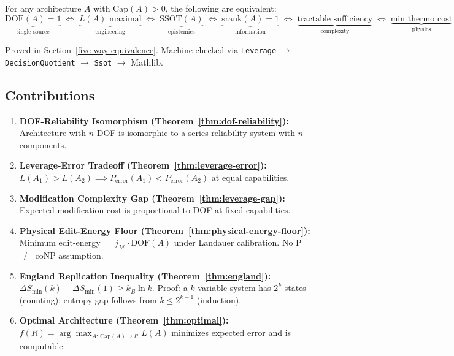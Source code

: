 \begin{theorem}\label{thm:five-way}
For any architecture $A$ with $\mathrm{Cap}(A) > 0$, the following are equivalent:
\[
\underbrace{\mathrm{DOF}(A) = 1}_{\text{single source}}
\;\iff\;
\underbrace{L(A) \text{ maximal}}_{\text{engineering}}
\;\iff\;
\underbrace{\mathrm{SSOT}(A)}_{\text{epistemics}}
\;\iff\;
\underbrace{\mathrm{srank}(A) = 1}_{\text{information}}
\;\iff\;
\underbrace{\text{tractable sufficiency}}_{\text{complexity}}
\;\iff\;
\underbrace{\text{min thermo cost}}_{\text{physics}}
\]
\end{theorem}

Proved in Section~\ref{five-way-equivalence}. Machine-checked via \texttt{Leverage} $\to$ \texttt{DecisionQuotient} $\to$ \texttt{Ssot} $\to$ Mathlib.

\subsection{Contributions}

\begin{enumerate}
\item \textbf{DOF-Reliability Isomorphism (Theorem~\ref{thm:dof-reliability}):} Architecture with $n$ DOF is isomorphic to a series reliability system with $n$ components.

\item \textbf{Leverage-Error Tradeoff (Theorem~\ref{thm:leverage-error}):} $L(A_1) > L(A_2) \implies P_{\mathrm{error}}(A_1) < P_{\mathrm{error}}(A_2)$ at equal capabilities.

\item \textbf{Modification Complexity Gap (Theorem~\ref{thm:leverage-gap}):} Expected modification cost is proportional to DOF at fixed capabilities.

\item \textbf{Physical Edit-Energy Floor (Theorem~\ref{thm:physical-energy-floor}):} Minimum edit-energy $= j_\mathcal{M} \cdot \mathrm{DOF}(A)$ under Landauer calibration. No P~$\neq$~coNP assumption. 

\item \textbf{England Replication Inequality (Theorem~\ref{thm:england}):} $\Delta S_{\min}(k) - \Delta S_{\min}(1) \geq k_B \ln k$. Proof: a $k$-variable system has $2^k$ states (counting); entropy gap follows from $k \leq 2^{k-1}$ (induction). 

\item \textbf{Optimal Architecture (Theorem~\ref{thm:optimal}):} $f(R) = \arg\max_{A:\,\mathrm{Cap}(A) \supseteq R} L(A)$ minimizes expected error and is computable.
\end{enumerate}

